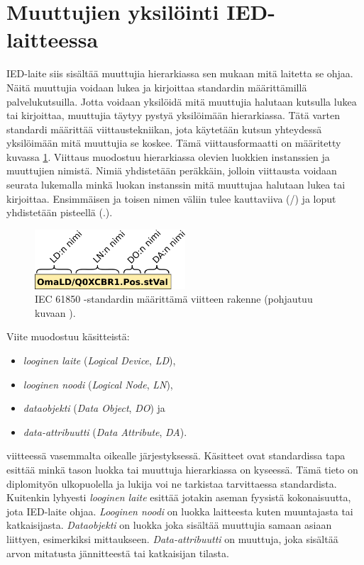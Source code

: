 \section{Muuttujien yksilöinti IED-laitteessa}
IED-laite siis sisältää muuttujia hierarkiassa sen mukaan mitä laitetta se ohjaa. Näitä muuttujia voidaan lukea ja kirjoittaa standardin määrittämillä palvelukutsuilla. Jotta voidaan yksilöidä mitä muuttujia halutaan kutsulla lukea tai kirjoittaa, muuttujia täytyy pystyä yksilöimään hierarkiassa. Tätä varten standardi määrittää viittaustekniikan, jota käytetään kutsun yhteydessä yksilöimään mitä muuttujia se koskee. Tämä viittausformaatti on määritetty kuvassa \ref{fig:iec61850-data-reference}. Viittaus muodostuu hierarkiassa olevien luokkien instanssien ja muuttujien nimistä. Nimiä yhdistetään peräkkäin, jolloin viittausta voidaan seurata lukemalla minkä luokan instanssin mitä muuttujaa halutaan lukea tai kirjoittaa. Ensimmäisen ja toisen nimen väliin tulee kauttaviiva (/) ja loput yhdistetään pisteellä (.). \cite[s.~625--626]{Mackiewicz2006} \mbox{\cite[s.~181--182]{IEC61850-7-2}} \mbox{\cite[s.~93--95]{IEC61850-7-1}}

\begin{figure}[ht!]
	\includegraphics[width=0.5\textwidth]{pictures/iec61850-data-reference.png}
	\caption{IEC 61850 -standardin määrittämä viitteen rakenne (pohjautuu kuvaan \mbox{\cite[s.~93]{IEC61850-7-1}}).}
	\label{fig:iec61850-data-reference}
\end{figure}

Viite muodostuu käsitteistä:
\begin{itemize}
	\item \emph{looginen laite} (\emph{Logical Device}, \emph{LD}),
	\item \emph{looginen noodi} (\emph{Logical Node}, \emph{LN}),
	\item \emph{dataobjekti} (\emph{Data Object}, \emph{DO}) ja
	\item \emph{data-attribuutti} (\emph{Data Attribute}, \emph{DA}).
\end{itemize}
viitteessä vasemmalta oikealle järjestyksessä. Käsitteet ovat standardissa tapa esittää minkä tason luokka tai muuttuja hierarkiassa on kyseessä. Tämä tieto on diplomityön ulkopuolella ja lukija voi ne tarkistaa tarvittaessa standardista. Kuitenkin lyhyesti \emph{looginen laite} esittää jotakin aseman fyysistä kokonaisuutta, jota IED-laite ohjaa. \emph{Looginen noodi} on luokka laitteesta kuten muuntajasta tai katkaisijasta. \emph{Dataobjekti} on luokka joka sisältää muuttujia samaan asiaan liittyen, esimerkiksi mittaukseen. \emph{Data-attribuutti} on muuttuja, joka sisältää arvon mitatusta jännitteestä tai katkaisijan tilasta. \cite[s.~2]{Camachi2017}


